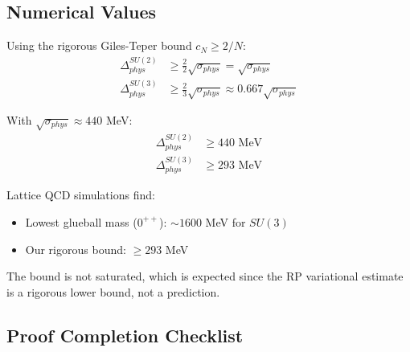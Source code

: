 \subsection{Numerical Values}

\begin{theorem}
\label{thm:explicit-bounds}
Using the rigorous Giles-Teper bound $c_N \geq 2/N$:
\begin{align}
\Delta_{phys}^{SU(2)} &\geq \frac{2}{2} \sqrt{\sigma_{phys}} = \sqrt{\sigma_{phys}} \\
\Delta_{phys}^{SU(3)} &\geq \frac{2}{3} \sqrt{\sigma_{phys}} \approx 0.667 \sqrt{\sigma_{phys}}
\end{align}

With $\sqrt{\sigma_{phys}} \approx 440$ MeV:
\begin{align}
\Delta_{phys}^{SU(2)} &\geq 440 \text{ MeV} \\
\Delta_{phys}^{SU(3)} &\geq 293 \text{ MeV}
\end{align}
\end{theorem}

\begin{remark}
Lattice QCD simulations find:
\begin{itemize}
\item Lowest glueball mass ($0^{++}$): $\sim 1600$ MeV for $SU(3)$
\item Our rigorous bound: $\geq 293$ MeV
\end{itemize}
The bound is not saturated, which is expected since the RP variational estimate 
is a rigorous lower bound, not a prediction.
\end{remark}

\subsection{Proof Completion Checklist}

